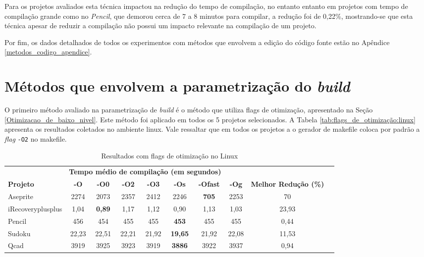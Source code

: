 Para os projetos avaliados esta técnica impactou na redução do tempo de compilação, no entanto entanto em projetos com tempo de compilação grande como no \textit{Pencil}, que demorou cerca de 7 a 8 minutos para compilar, a redução foi de 0,22\%, mostrando-se que esta técnica apesar de reduzir a compilação não possui um impacto relevante na compilação de um projeto.

Por fim, os dados detalhados de todos os experimentos com métodos que envolvem a edição do código fonte estão no Apêndice \ref{metodos_codigo_apendice}.



\section{Métodos que envolvem a parametrização do \textit{build}}


O primeiro método avaliado na parametrização de \textit{build} é o
 método que utiliza flags de otimização,
 apresentado na Seção \ref{Otimizacao_de_baixo_nivel}. Este método foi
 aplicado em todos os 5 projetos selecionados. A Tabela 
\ref{tab:flags_de_otimização:linux} apresenta os resultados coletados no ambiente linux.
 Vale ressaltar que em todos os projetos a o gerador de makefile coloca por padrão a \textit{flag} \texttt{-O2} no makefile.
 
\begin{table}[!ht]
\tiny
\centering
\caption{Resultados com flags de otimização no Linux}
\label{tab:flags_otimizacao:linux}
\begin{tabular}{lccccccccc}
& \multicolumn{6}{c}{\textbf{Tempo médio de compilação (em segundos)} } \\
 \textbf{Projeto}& \textbf{-O}  & \textbf{-O0}   & \textbf{-O2} & \textbf{-O3} & \textbf{-Os} & \textbf{-Ofast} & \textbf{-Og} & \textbf{Melhor Redução (\%)}\\ \toprule
Aseprite            & 2274  & 2073          & 2357  & 2412  & 2246              & \textbf{705} & 2253 & 70 \\
iRecoveryplusplus   & 1,04  & \textbf{0,89} &  1,17 & 1,12  & 0,90              & 1,13  & 1,03 & 23,93 \\
Pencil              & 456   & 454           &  455  & 455   & \textbf{453}      & 455   & 455 & 0,44\\
Sudoku              & 22,23 & 22,51         & 22,21 & 21,92 & \textbf{19,65}    & 21,92 & 22,08 &  11,53 \\ 
Qcad                & 3919  &  3925         &  3923 & 3919  & \textbf{3886}     & 3922  & 3937 & 0,94  \\ 
\end{tabular}
\end{table}


